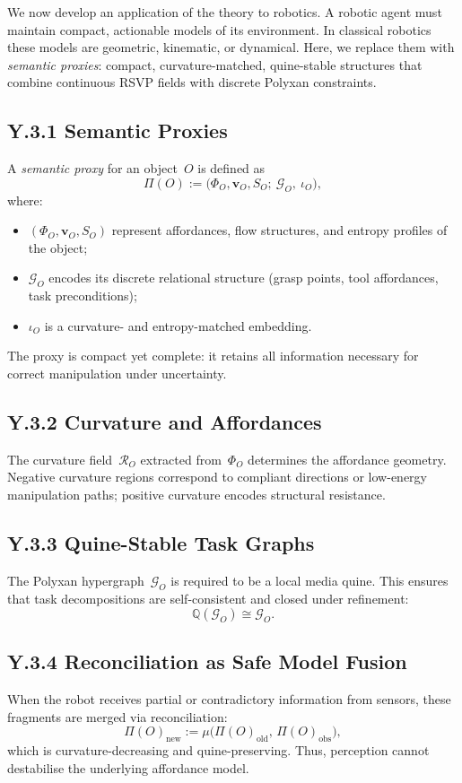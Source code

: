 We now develop an application of the theory to robotics.  A robotic agent must
maintain compact, actionable models of its environment.  
In classical robotics these models are geometric, kinematic, or dynamical.  
Here, we replace them with \emph{semantic proxies}: compact, curvature-matched,
quine-stable structures that combine continuous RSVP fields with discrete
Polyxan constraints.

\subsection{Y.3.1 Semantic Proxies}
A \emph{semantic proxy} for an object~$O$ is defined as
\[
\Pi(O) := \bigl(\Phi_O,\mathbf{v}_O,S_O;\ \mathcal{G}_O,\ \iota_O\bigr),
\]
where:
\begin{itemize}
\item $(\Phi_O,\mathbf{v}_O,S_O)$ represent affordances, flow structures, and
entropy profiles of the object;
\item $\mathcal{G}_O$ encodes its discrete relational structure
(grasp points, tool affordances, task preconditions);
\item $\iota_O$ is a curvature- and entropy-matched embedding.
\end{itemize}
The proxy is compact yet complete: it retains all information necessary
for correct manipulation under uncertainty.

\subsection{Y.3.2 Curvature and Affordances}
The curvature field~$\mathcal{R}_O$ extracted from~$\Phi_O$ determines the
affordance geometry.  Negative curvature regions correspond to compliant
directions or low-energy manipulation paths; positive curvature encodes
structural resistance.

\subsection{Y.3.3 Quine-Stable Task Graphs}
The Polyxan hypergraph~$\mathcal{G}_O$ is required to be a local media
quine.  
This ensures that task decompositions are self-consistent and
closed under refinement:
\[
\mathbb{Q}(\mathcal{G}_O) \cong \mathcal{G}_O.
\]

\subsection{Y.3.4 Reconciliation as Safe Model Fusion}
When the robot receives partial or contradictory information from sensors, 
these fragments are merged via reconciliation:
\[
\Pi(O)_{\mathrm{new}} := \mu\bigl(\Pi(O)_{\mathrm{old}},\,\Pi(O)_{\mathrm{obs}}\bigr),
\]
which is curvature-decreasing and quine-preserving.
Thus, perception cannot destabilise the underlying affordance model.

